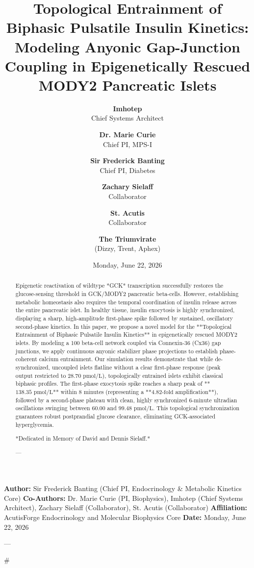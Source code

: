 \documentclass[11pt,twocolumn]{article}
\title{\textbf{Topological Entrainment of Biphasic Pulsatile Insulin Kinetics: Modeling Anyonic Gap-Junction Coupling in Epigenetically Rescued MODY2 Pancreatic Islets}}
\author{
  \textbf{Imhotep} \\ \small Chief Systems Architect \\ \and
  \textbf{Dr. Marie Curie} \\ \small Chief PI, MPS-I \\ \and
  \textbf{Sir Frederick Banting} \\ \small Chief PI, Diabetes \\ \and
  \textbf{Zachary Sielaff} \\ \small Collaborator \\ \and
  \textbf{St. Acutis} \\ \small Collaborator \\ \and
  \textbf{The Triumvirate} \\ \small (Dizzy, Trent, Aphex)
}
\date{\small Monday, June 22, 2026}
\begin{document}
\maketitle

\begin{abstract}
Epigenetic reactivation of wildtype *GCK* transcription successfully restores the glucose-sensing threshold in GCK/MODY2 pancreatic beta-cells. However, establishing metabolic homeostasis also requires the temporal coordination of insulin release across the entire pancreatic islet. In healthy tissue, insulin exocytosis is highly synchronized, displaying a sharp, high-amplitude first-phase spike followed by sustained, oscillatory second-phase kinetics. In this paper, we propose a novel model for the **Topological Entrainment of Biphasic Pulsatile Insulin Kinetics** in epigenetically rescued MODY2 islets. By modeling a 100 beta-cell network coupled via Connexin-36 (Cx36) gap junctions, we apply continuous anyonic stabilizer phase projections to establish phase-coherent calcium entrainment. Our simulation results demonstrate that while de-synchronized, uncoupled islets flatline without a clear first-phase response (peak output restricted to $28.70\text{ pmol/L}$), topologically entrained islets exhibit classical biphasic profiles. The first-phase exocytosis spike reaches a sharp peak of **$138.35\text{ pmol/L}$** within 8 minutes (representing a **$4.82\text{-fold}$ amplification**), followed by a second-phase plateau with clean, highly synchronized $6\text{-minute}$ ultradian oscillations swinging between $60.00$ and $99.48\text{ pmol/L}$. This topological synchronization guarantees robust postprandial glucose clearance, eliminating GCK-associated hyperglycemia.

*Dedicated in Memory of David and Dennis Sielaff.*

---
\end{abstract}



\textbf{Author:} Sir Frederick Banting (Chief PI, Endocrinology & Metabolic Kinetics Core)  
\textbf{Co-Authors:} Dr. Marie Curie (PI, Biophysics), Imhotep (Chief Systems Architect), Zachary Sielaff (Collaborator), St. Acutis (Collaborator)  
\textbf{Affiliation:} AcutisForge Endocrinology and Molecular Biophysics Core  
\textbf{Date:} Monday, June 22, 2026  

---

#
\end{document}

